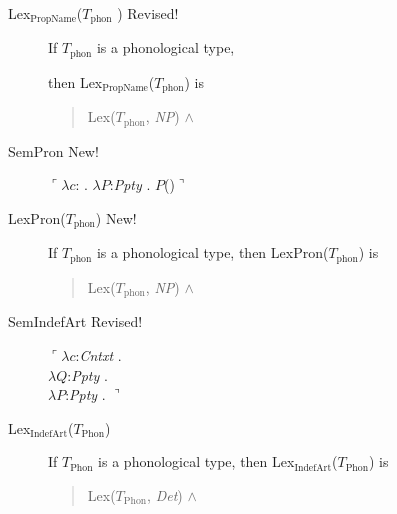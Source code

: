 \begin{description}
\item[\textnormal{Lex$_{\mathrm{PropName}}$($T_{\mathrm{phon}}$
    )} Revised!] \mbox{}

  If $T_{\mathrm{phon}}$ is a phonological type,

  then Lex$_{\mathrm{PropName}}$($T_{\mathrm{phon}}$) is
  \begin{quote}
    Lex($T_{\mathrm{phon}}$, \textit{NP}) \d{$\wedge$}
\end{quote}

\item[\textnormal{SemPron} New!] \mbox{}

  $\ulcorner\lambda c$: . $\lambda
  P$:\textit{Ppty}
  . $P$()$\urcorner$

\item[\textnormal{LexPron($T_{\text{phon}}$)} New!] \mbox{}

If $T_{\text{phon}}$ is a phonological type, then
LexPron($T_{\text{phon}}$) is
\begin{quote}
Lex($T_{\mathrm{phon}}$, \textit{NP}) \d{$\wedge$}
\end{quote}

  
\item[\textnormal{SemIndefArt} Revised!] \mbox{}

  $\ulcorner\lambda c$:\textit{Cntxt} . \\
\hspace*{1em}$\lambda Q$:\textit{Ppty} . \\
\hspace*{2em} $\lambda P$:\textit{Ppty}
. $\urcorner$

        
      \item[\textnormal{Lex$_{\mathrm{IndefArt}}$($T_{\mathrm{Phon}}$)}]
        \mbox{}

        If $T_{\mathrm{Phon}}$ is a phonological type, then
        Lex$_{\mathrm{IndefArt}}$($T_{\mathrm{Phon}}$) is
        \begin{quote}
          Lex($T_{\mathrm{Phon}}$, \textit{Det}) \d{$\wedge$}
        \end{quote}
        

\end{description}
